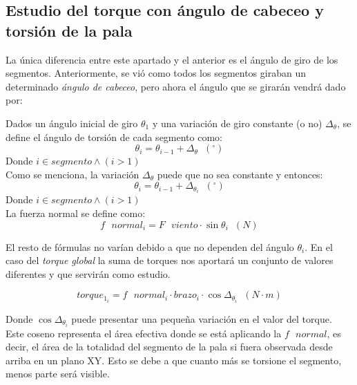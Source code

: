  
 \subsection{Estudio del torque con ángulo de cabeceo y torsión de la pala}
\label{section:torque_giro_torsion}

La única diferencia entre este apartado y el anterior es el ángulo de giro de los segmentos. Anteriormente, se vió como todos los segmentos giraban un determinado \textit{ángulo de cabeceo}, pero ahora el ángulo que se girarán vendrá dado por:

Dados un ángulo inicial de giro $\theta_1 $ y una variación de giro constante (o no) $\Delta_\theta$, se define el ángulo de torsión de cada segmento como:
\begin{equation}
\theta_i = \theta_{i-1} + \Delta_\theta \hspace{7pt} (^{\circ})
\label{def:theta_cte}
\end{equation}
Donde $i \in segmento \wedge (i > 1)$\\


Como se menciona, la variación $\Delta_\theta$ puede que no sea constante y entonces:
\begin{equation}
\theta_i = \theta_{i-1} + \Delta_{\theta_{i}}  \hspace{7pt} (^{\circ})
\label{def:theta_nocte}
\end{equation}
Donde $i \in segmento \wedge (i > 1)$\\

La fuerza normal se define como:
\begin{equation}
   f \text{ } normal_i = F \text{ } viento \cdot \sin{\theta_i} \hspace{7pt} (N)
  \label{def:fuerza_normal_torsion}
 \end{equation}

El resto de fórmulas no varían debido a que no dependen del ángulo $\theta_i$. En el caso del \textit{torque global} la suma de torques nos aportará un conjunto de valores diferentes y que servirán como estudio.

  \begin{equation}
  torque_{1_i} = f \text{ } normal_i \cdot brazo_i \cdot \cos{\Delta_{\theta_{i}}} \hspace{7pt} (N \cdot m)
 \label{def:torque_algebraico_torsion}
 \end{equation}
 
Donde $ \cos{\Delta_{\theta_{i}}} $ puede presentar una pequeña variación en el valor del torque. Este coseno representa el área efectiva donde se está aplicando la $ f \text{ } normal $, es decir, el área de la totalidad del segmento de la pala si fuera observada desde arriba en un plano XY. Esto se debe a que cuanto más se torsione el segmento, menos parte será visible.\\

